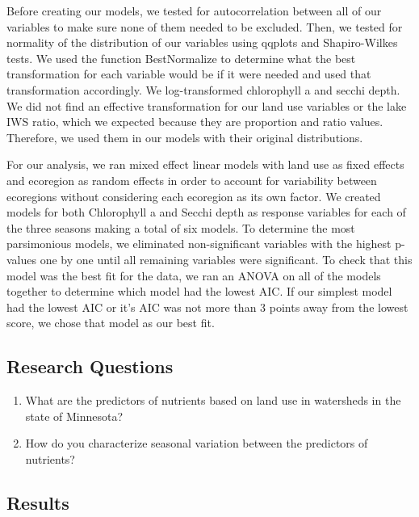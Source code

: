 \documentclass[12pt,]{article}
\begin{document}
Before creating our models, we tested for autocorrelation between all of
our variables to make sure none of them needed to be excluded. Then, we
tested for normality of the distribution of our variables using qqplots
and Shapiro-Wilkes tests. We used the function BestNormalize to
determine what the best transformation for each variable would be if it
were needed and used that transformation accordingly. We log-transformed
chlorophyll a and secchi depth. We did not find an effective
transformation for our land use variables or the lake IWS ratio, which
we expected because they are proportion and ratio values. Therefore, we
used them in our models with their original distributions.

For our analysis, we ran mixed effect linear models with land use as
fixed effects and ecoregion as random effects in order to account for
variability between ecoregions without considering each ecoregion as its
own factor. We created models for both Chlorophyll a and Secchi depth as
response variables for each of the three seasons making a total of six
models. To determine the most parsimonious models, we eliminated
non-significant variables with the highest p-values one by one until all
remaining variables were significant. To check that this model was the
best fit for the data, we ran an ANOVA on all of the models together to
determine which model had the lowest AIC. If our simplest model had the
lowest AIC or it's AIC was not more than 3 points away from the lowest
score, we chose that model as our best fit.

\hypertarget{research-questions}{%
\subsection{Research Questions}\label{research-questions}}

\begin{enumerate}
\def\labelenumi{\arabic{enumi}.}
\item
  What are the predictors of nutrients based on land use in watersheds
  in the state of Minnesota?
\item
  How do you characterize seasonal variation between the predictors of
  nutrients?
\end{enumerate}

\hypertarget{results}{%
\subsection{Results}\label{results}}
\end{document}
